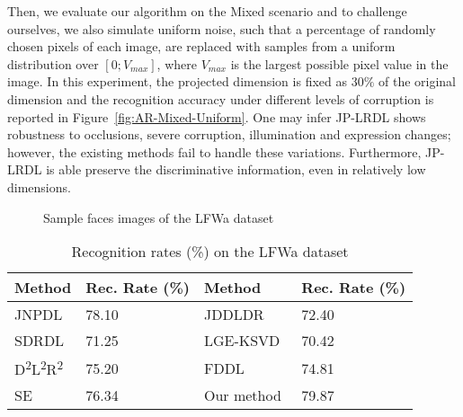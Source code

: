 \documentclass[journal]{IEEEtran}
\newcommand\Tstrut{\rule{0pt}{2.6ex}}         %
\newcommand\Bstrut{\rule[-0.9ex]{0pt}{0pt}}   %
\begin{document}
Then, we evaluate our algorithm on the Mixed scenario and to challenge ourselves, we also simulate uniform noise, such that a percentage of randomly chosen pixels of each image, are replaced with samples from a uniform distribution over $[0; V_{max}]$, where $V_{max}$ is the largest possible pixel value in the image. In this experiment, the projected dimension is fixed as $30\%$ of the original dimension and the recognition accuracy under different levels of corruption is reported in Figure~\ref{fig:AR-Mixed-Uniform}. One may infer JP-LRDL shows robustness to occlusions, severe corruption, illumination and expression changes; however, the existing methods fail to handle these variations. Furthermore, JP-LRDL is able preserve the discriminative information, even in relatively low dimensions.
\begin{figure}[t]
\caption{Sample faces images of the LFWa dataset}
\vspace{-1.5em}
\end{figure} 
\begin{table}[b]
\caption{Recognition rates (\%) on the LFWa dataset}
\label{table:LFW}
\centering
\begin{tabular}{|l|l|l|l|}
\hline
Method & Rec. Rate (\%) & Method & Rec. Rate (\%) \Tstrut\Bstrut\\
\hline \hline 
JNPDL~\cite{JNPDL}     & 78.10 &   JDDLDR~\cite{JDDRDL}      & 72.40 \Tstrut\Bstrut\\
SDRDL~\cite{Simul-DL}  & 71.25 &   LGE-KSVD~\cite{LGE-KSVD}  & 70.42 \Tstrut\Bstrut\\
D\textsuperscript{2}L\textsuperscript{2}R\textsuperscript{2}~\cite{D2L2R2} & 75.20 & FDDL~\cite{FDDL} & 74.81 \Tstrut\Bstrut\\
SE~\cite{SE}           & 76.34 &   Our method & 79.87 \Tstrut\Bstrut\\
\hline
\end{tabular}
\end{table}
\end{document}
